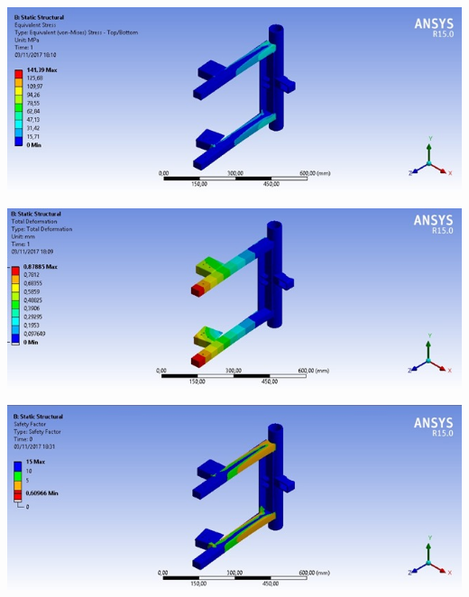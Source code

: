     \begin{center}
    	\includegraphics[scale=0.7]{figuras/stress_4}
        \label{stress_4}
    \end{center}
  
    \begin{center}
    	\includegraphics[scale=0.7]{figuras/deformacao_2}
        \label{deformacao_2}
    \end{center}

    \begin{center}
    	\includegraphics[scale=0.7]{figuras/fator_seguranca_4}
        \label{fator_seguranca_4}
    \end{center}
    
